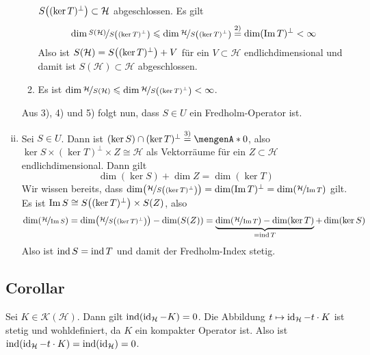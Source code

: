 \begin{enumerate}[(i)]
\begin{enumerate}[1)]
		$S \enbrace*{(\ker T)^\bot} \subset \mathcal{H}$ abgeschlossen. Es gilt
		\[
			\dim\nicefrac{S(\mathcal{H})}{S \enbrace*{(\ker T)^\bot}} \le \dim\nicefrac{\mathcal{H}}{S \enbrace*{(\ker T)^\bot} }
			\stackrel{\text{2)}}{=} \dim (\im T)^\bot < \infty
		\]
		Also ist $S(\mathcal{H})= S \enbrace*{(\ker T)^\bot} + V$ für ein $V \subset \mathcal{H}$ endlichdimensional und damit ist $S(\mathcal{H}) \subset \mathcal{H}$
		abgeschlossen.
		\item Es ist $\dim \nicefrac{\mathcal{H}}{S(\mathcal{H})} \le \dim  \nicefrac{\mathcal{H}}{S \enbrace*{(\ker T)^\bot}}<\infty$.
	\end{enumerate}
	Aus 3), 4) und 5) folgt nun, dass $S \in U$ ein Fredholm-Operator ist.
	\item Sei $S \in U$. Dann ist $(\ker S) \cap (\ker T)^\bot \stackrel{\text{3)}}{=} \set{0}$, also $\ker S \times (\ker T)^\bot \times Z \cong \mathcal{H}$ als Vektorräume
	für ein $Z \subset \mathcal{H}$ endlichdimensional. Dann gilt
	\[
		\dim (\ker S) + \dim Z =\dim (\ker T)
	\]
	Wir wissen bereits, dass $\dim \enbrace*{\nicefrac{\mathcal{H}}{S \enbrace*{(\ker T)^\bot} }}=\dim (\im T)^\bot =\dim \enbrace*{\nicefrac{\mathcal{H}}{\im T}}$ gilt.
	Es ist $\im S \cong S \enbrace*{(\ker T)^\bot} \times S(Z)$, also
	\[
		\dim \enbrace*{\nicefrac{\mathcal{H}}{\im S}} = \dim \enbrace*{\nicefrac{\mathcal{H}}{S \enbrace*{(\ker T)^\bot}}} - \dim \enbrace*{S(Z)}
		= \underbrace{\dim \enbrace*{\nicefrac{\mathcal{H}}{\im T}} - \dim (\ker T)}_{=\idx T} + \dim (\ker S)
	\]
	Also ist $\idx S = \idx T$ und damit der Fredholm-Index stetig. \bewende
\end{enumerate}

\subsection[Corollar: Für kompakte Operatoren $K \in \mathcal{K}(\mathcal{H})$ gilt für den Index $\idx(\id_\mathcal{H}- K)=0$]{Corollar} %
\label{sub:94}
Sei $K \in \mathcal{K}(\mathcal{H})$. Dann gilt $\idx(\id_\mathcal{H}- K)=0$.
Die Abbildung $t \mapsto \id_\mathcal{H} - t \cdot K$ ist stetig und wohldefiniert, da $K$ ein kompakter Operator ist. Also ist 
$\idx \enbrace*{\id_\mathcal{H}- t \cdot K}=\idx (\id_\mathcal{H})=0$. \bewende

